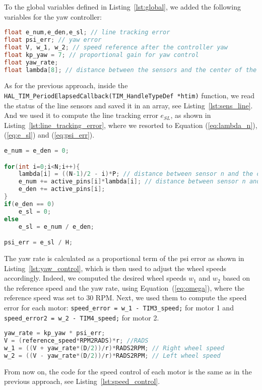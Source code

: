 To the global variables defined in Listing~\ref{lst:global}, we added the following variables for the yaw controller:
\begin{lstlisting}[language=C, caption={Global variables for yaw control}, label={lst:global_yaw}]
float e_num,e_den,e_sl; // line tracking error
float psi_err; // yaw error
float V, w_1, w_2; // speed reference after the controller yaw
float kp_yaw = 7; // proportional gain for yaw control
float yaw_rate; 
float lambda[8]; // distance between the sensors and the center of the sensor array
\end{lstlisting}

As for the previous approach, inside the \texttt{HAL\_TIM\_PeriodElapsedCallback(TIM\_HandleTypeDef *htim)} function, we read the status of the line sensors and saved it in an array, see Listing~\ref{lst:sens_line}.
And we used it to compute the line tracking error $e_{SL}$, as shown in Listing~\ref{lst:line_tracking_error}, where we resorted to Equation (\ref{eq:lambda_n}), (\ref{eq:e_sl}) and (\ref{eq:psi_err}).
\begin{lstlisting}[language=C, caption={Line tracking error}, label={lst:line_tracking_error}]
e_num = e_den = 0;

for(int i=0;i<N;i++){
    lambda[i] = ((N-1)/2 - i)*P; // distance between sensor n and the center
    e_num += active_pins[i]*lambda[i]; // distance between sensor n and the center
    e_den += active_pins[i];
}
if(e_den == 0)
    e_sl = 0;
else
    e_sl = e_num / e_den;

psi_err = e_sl / H;
\end{lstlisting}

The yaw rate is calculated as a proportional term of the psi error as shown in Listing~\ref{lst:yaw_control}, which is then used to adjust the wheel speeds accordingly.
Indeed, we computed the desired wheel speeds $w_1$ and $w_2$ based on the reference speed and the yaw rate, using Equation~(\ref{eq:omega}), where the reference speed was set to 30 RPM.
Next, we used them to compute the speed error for each motor: \texttt{speed\_error = w\_1 - TIM3\_speed;} for motor 1 and \texttt{speed\_error2 = w\_2 - TIM4\_speed;} for motor 2.
\begin{lstlisting}[language=C, caption={Yaw control law}, label={lst:yaw_control}]
yaw_rate = kp_yaw * psi_err; 
V = (reference_speed*RPM2RADS)*r; //RADS
w_1 = ((V + yaw_rate*(D/2))/r)*RADS2RPM; // Right wheel speed
w_2 = ((V - yaw_rate*(D/2))/r)*RADS2RPM; // Left wheel speed
\end{lstlisting}

From now on, the code for the speed control of each motor is the same as in the previous approach, see Listing~\ref{lst:speed_control}.